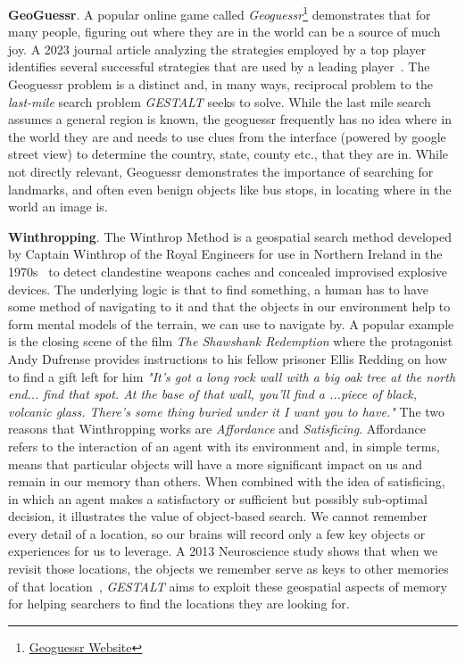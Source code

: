 \textbf{GeoGuessr}. A popular online game called \textit{Geoguessr}\footnote{\href{https://www.geoguessr.com/}{Geoguessr Website}} demonstrates that for many people, figuring out where they are in the world can be a source of much joy. 
A 2023 journal article analyzing the strategies employed by a top player identifies several successful strategies that are used by a leading player~\cite{Berners-Lee2023}. 
The Geoguessr problem is a distinct and, in many ways, reciprocal problem to the \textit{last-mile} search problem \textit{GESTALT} seeks to solve. While the last mile search assumes a general region is known, the geoguessr frequently has no idea where in the world they are and needs to use clues from the interface (powered by google street view) to determine the country, state, county etc., that they are in. 
While not directly relevant, Geoguessr demonstrates the importance of searching for landmarks, and often even benign objects like bus stops, in locating where in the world an image is. 

\textbf{Winthropping}. The Winthrop Method is a geospatial search method developed by Captain Winthrop of the Royal Engineers for use in Northern Ireland in the 1970s~\cite{Keatley2021} to detect clandestine weapons caches and concealed improvised explosive devices. 
The underlying logic is that to find something, a human has to have some method of navigating to it and that the objects in our environment help to form mental models of the terrain, we can use to navigate by. 
A popular example is the closing scene of the film \textit{The Shawshank Redemption} where the protagonist Andy Dufrense provides instructions to his fellow prisoner Ellis Redding on how to find a gift left for him \textit{"It's got a long rock wall with a big oak tree at the north end... find that spot. At the base of that wall, you'll find a ...piece of black, volcanic glass. There's some thing buried under it I want you to have."} 
The two reasons that Winthropping works are \textit{Affordance} and \textit{Satisficing}. Affordance refers to the interaction of an agent with its environment and, in simple terms, means that particular objects will have a more significant impact on us and remain in our memory than others. 
When combined with the idea of satisficing, in which an agent makes a satisfactory or sufficient but possibly sub-optimal decision, it illustrates the value of object-based search. 
We cannot remember every detail of a location, so our brains will record only a few key objects or experiences for us to leverage. 
A 2013 Neuroscience study shows that when we revisit those locations, the objects we remember serve as keys to other memories of that location~\cite{Miller2013}, \textit{GESTALT} aims to exploit these geospatial aspects of memory for helping searchers to find the locations they are looking for.

